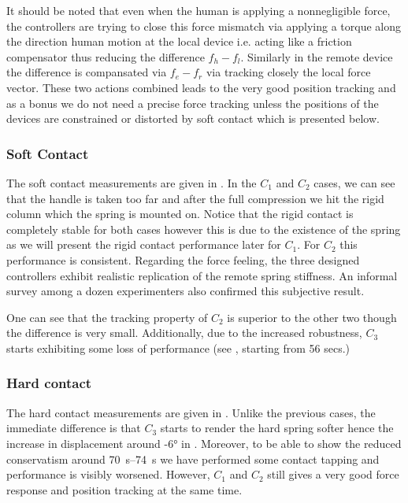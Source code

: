 It should be noted that even when the human is applying a nonnegligible force, the controllers are trying to close this force mismatch 
via applying a torque along the direction human motion at the local device i.e. acting like a friction compensator thus reducing the 
difference $f_h-f_l$. Similarly in the remote device the difference is compansated  via $f_e-f_r$ via tracking closely the local force 
vector. These two actions combined leads to the very good position tracking and as a bonus we do not need a precise force tracking unless 
the positions of the devices are constrained or distorted by soft contact which is presented below.



\subsubsection{Soft Contact}

The soft contact measurements are given in . 
In the $C_1$ and $C_2$ cases, 
we can see that the handle is taken too far and after the full compression we hit 
the rigid column which the spring is mounted on. Notice that the rigid contact is
completely stable for both cases however this is due to the existence of the spring 
as we will present the rigid contact performance later for $C_1$. For $C_2$ this 
performance is consistent. Regarding the force feeling, the three designed controllers
exhibit realistic replication of the remote spring stiffness. An informal survey among 
a dozen experimenters also confirmed this subjective result. 

One can see that the tracking property of $C_2$ is superior to the other two though the
difference is very small. Additionally, due to the increased robustness, $C_3$ starts
exhibiting some loss of performance (see , starting from 56 secs.)

\subsubsection{Hard contact}

The hard contact measurements are given in . Unlike the 
previous cases, the immediate difference is that $C_3$ starts to render the hard spring softer hence the increase in
displacement around \ang{-6} in . Moreover, to be able to show the reduced conservatism around 
\SIrange{70}{74}{\second} we have performed some contact tapping and performance is visibly worsened. However, $C_1$ and $C_2$ 
still gives a very good force response and position tracking at the same time. 


